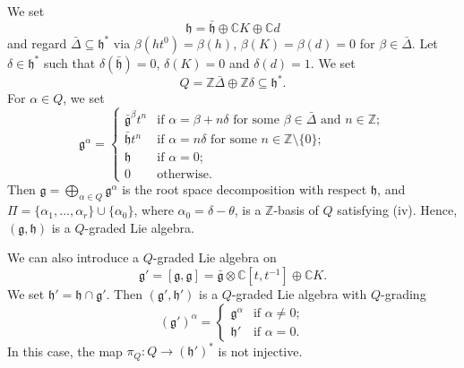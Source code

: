 \documentclass{beamer}
\begin{document}
\begin{frame}
  We set
  \begin{equation*}
    \mathfrak{h} = \bar{\mathfrak{h}} \oplus \mathbb{C}K \oplus \mathbb{C}d
  \end{equation*}
  and regard $\bar{\Delta} \subseteq \mathfrak{h}^*$ via $\beta(ht^0) = \beta(h)$, $\beta(K) = \beta(d) = 0$ for $\beta \in \bar{\Delta}$.
  Let $\delta \in \mathfrak{h}^*$ such that $\delta(\bar{\mathfrak{h}}) = 0$, $\delta(K) = 0$ and $\delta(d) = 1$.
  We set
  \begin{equation*}
    Q = \mathbb{Z}\bar{\Delta} \oplus \mathbb{Z}\delta \subseteq \mathfrak{h}^*.
  \end{equation*}
  For $\alpha \in Q$, we set
  \begin{equation*}
    \mathfrak{g}^{\alpha} =
    \begin{cases}
      \bar{\mathfrak{g}}^{\beta}t^n &\text{if $\alpha = \beta + n\delta$ for some $\beta \in \bar{\Delta}$ and $n \in \mathbb{Z}$}; \\
      \bar{\mathfrak{h}}t^n &\text{if $\alpha = n\delta$ for some $n \in \mathbb{Z} \setminus \{0\}$}; \\
      \mathfrak{h} &\text{if $\alpha = 0$}; \\
      0 &\text{otherwise}.
    \end{cases}
  \end{equation*}
  Then $\mathfrak{g} = \bigoplus_{\alpha \in Q}\mathfrak{g}^{\alpha}$ is the root space decomposition with respect $\mathfrak{h}$, and $\Pi = \{\alpha_1, \dots, \alpha_r\} \cup \{\alpha_0\}$, where $\alpha_0 = \delta - \theta$, is a $\mathbb{Z}$-basis of $Q$ satisfying (iv).
  Hence, $(\mathfrak{g}, \mathfrak{h})$ is a $Q$-graded Lie algebra.
\end{frame}

\begin{frame}
  We can also introduce a $Q$-graded Lie algebra on
  \begin{equation*}
    \mathfrak{g}' = [\mathfrak{g}, \mathfrak{g}] = \bar{\mathfrak{g}} \otimes \mathbb{C}[t, t^{-1}] \oplus \mathbb{C}K.
  \end{equation*}
  We set $\mathfrak{h}' = \mathfrak{h} \cap \mathfrak{g}'$.
  Then $(\mathfrak{g}', \mathfrak{h}')$ is a $Q$-graded Lie algebra with $Q$-grading
  \begin{equation*}
    (\mathfrak{g}')^{\alpha} =
    \begin{cases}
      \mathfrak{g}^{\alpha} &\text{if $\alpha \neq 0$}; \\
      \mathfrak{h}' &\text{if $\alpha = 0$}.
    \end{cases}
  \end{equation*}
  In this case, the map $\pi_Q: Q \to (\mathfrak{h}')^*$ is not injective.
\end{frame}
\end{document}
